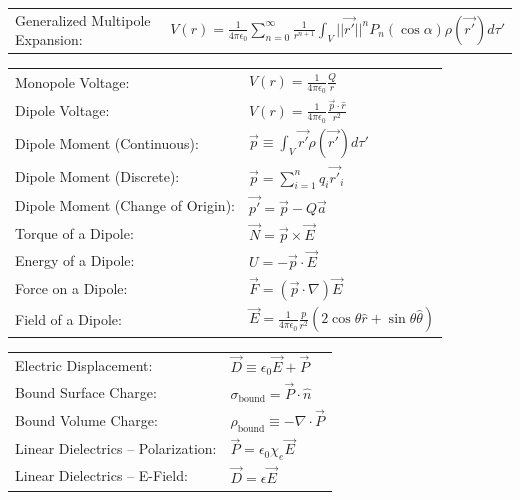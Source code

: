 \documentclass{article}
\newcommand{\kfrac}{\frac{1}{4\pi\epsilon_0}}
\newcommand{\formbox}[2]{\begin{center} \begin{tcolorbox}[title = #1, boxrule=2pt,arc=3.4pt,boxsep=0mm] #2\end{tcolorbox}\end{center}}
\begin{document}
\begin{multicols*}{2}
{{\begin{tabular}{ m{12em} m{25em}  }
        \end{tabular}}
    }
    \formbox{Electrostatic Multipoles}{
        {\renewcommand{\arraystretch}{2}%
        \begin{tabular}{ m{8em} m{30em}  }
            Generalized Multipole Expansion: & $\displaystyle V(r) = \frac{1}{4\pi \epsilon_0}\sum_{n = 0}^\infty \frac{1}{r^{n + 1}} \int_{V} ||\vec{r'}||^n P_n(\cos \alpha)\rho(\vec{r'})d\tau'$\\
        \end{tabular}}
        \begin{tabular}{ m{15em} m{20em}  }
            Monopole Voltage: & $\displaystyle V(r) = \kfrac\frac{Q}{r}$\\
            Dipole Voltage: & $\displaystyle V(r) = \kfrac \frac{\vec{p}\cdot \hat{r}}{r^2}$\\
            Dipole Moment (Continuous): & $\displaystyle \vec{p} \equiv \int_V \vec{r'}\rho(\vec{r'})d\tau'$\\
            Dipole Moment (Discrete): & $\displaystyle \vec{p} = \sum_{i = 1}^n q_i \vec{r'}_i$\\
            Dipole Moment (Change of Origin): & $\vec{p'} = \vec{p} - Q\vec{a}$\\
            Torque of a Dipole: & $\displaystyle \vec{N} = \vec{p} \times \vec{E}$\\
            Energy of a Dipole: & $\displaystyle U = -\vec{p} \cdot \vec{E}$\\
            Force on a Dipole: & $\displaystyle \vec{F} = (\vec{p} \cdot \nabla)\vec{E}$\\
            Field of a Dipole: & $\displaystyle \vec{E} = \kfrac\frac{p}{r^2}\left(2 \cos \theta \hat{r} + \sin \theta \hat{\theta}\right)$
        \end{tabular}
    }
    \formbox{Electrostatics in Matter}{
        {\renewcommand{\arraystretch}{1.75}%
        \begin{tabular}{ m{12em} m{25em}  }
            Electric Displacement: & $\displaystyle \vec{D} \equiv \epsilon_0 \vec{E} + \vec{P}$\\
            Bound Surface Charge: & $\displaystyle \sigma_\textrm{bound} = \vec{P} \cdot \hat{n}$\\
            Bound Volume Charge: & $\displaystyle \rho_\textrm{bound} \equiv -\nabla \cdot \vec{P}$\\
            Linear Dielectrics -- Polarization: & $\displaystyle \vec{P} = \epsilon_0 \chi_e \vec{E}$\\
            Linear Dielectrics -- E-Field: & $\displaystyle \vec{D} = \epsilon \vec{E}$\\

\end{tabular}}}
\end{multicols*}
\end{document}
